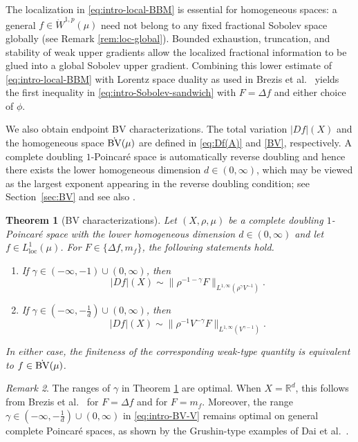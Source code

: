 \documentclass[11pt]{amsart}
\newtheorem{theorem}{Theorem}[section]
\theoremstyle{definition}
\theoremstyle{remark}
\newtheorem{remark}[theorem]{Remark}
\numberwithin{equation}{section}
\begin{document}
The localization in \eqref{eq:intro-local-BBM} is essential for homogeneous
spaces: a general $f\in\dot W^{1,p}(\mu)$ need not belong to any fixed
fractional Sobolev space globally (see Remark \ref{rem:loc-global}).  Bounded exhaustion,
truncation, and stability of
weak upper gradients allow the localized fractional information to be glued
into a global Sobolev upper gradient.  Combining this lower estimate of
\eqref{eq:intro-local-BBM}
with Lorentz space duality as used in Brezis et al.\ \cite{BSVY} yields the first
inequality in \eqref{eq:intro-Sobolev-sandwich} with $F=\Delta f$ and either
choice of $\phi$.

We also obtain endpoint BV characterizations.  The total variation
$|Df|(X)$ and the homogeneous space $\dot{\rm BV}(\mu)$ are defined in
\eqref{eq:Df(A)} and \eqref{BV}, respectively.  A complete doubling
$1$-Poincar\'e space is automatically reverse doubling and hence
there exists the lower homogeneous dimension
$d\in(0,\infty)$, which may be viewed as the largest exponent appearing in
the reverse doubling condition; see Section~\ref{sec:BV} and see also
\cite[(1.14)]{DLYYZ}.

\begin{theorem}[BV characterizations]\label{thm:intro-BV}
Let $(X,\rho,\mu)$ be a complete doubling $1$-Poincar\'e space
with the lower homogeneous dimension $d\in(0,\infty)$ and let
$f\in L^1_{\mathrm{loc}}(\mu)$.  For $F\in\{\Delta f,m_f\}$, the following statements hold.
\begin{enumerate}[\rm(i)]
\item If $\gamma\in(-\infty,-1)\cup(0,\infty)$, then
\begin{equation}
 |Df|(X)
 \sim \|\rho^{-1-\gamma}F\|_{L^{1,\infty}(\rho^\gamma V^{-1})}.
\end{equation}
\item If $\gamma\in(-\infty,-\frac1d)\cup(0,\infty)$, then
\begin{equation}\label{eq:intro-BV-V}
 |Df|(X)
 \sim \|\rho^{-1}V^{-\gamma}F\|_{L^{1,\infty}(V^{\gamma-1})}.
\end{equation}
\end{enumerate}
In either case, the finiteness of the corresponding weak-type quantity is
equivalent to $f\in\dot{\rm BV}(\mu)$.
\end{theorem}

\begin{remark}
The ranges of $\gamma$ in Theorem \ref{thm:intro-BV} are optimal. When
$X=\mathbb R^d$, this follows from Brezis et al.\
\cite[Theorem~1.4(i)]{BSVY} for $F=\Delta f$ and \cite[Remark 1.4(ii)]{ZLYYZ24}
for $F=m_f$. Moreover, the range
$\gamma\in(-\infty,-\frac1d)\cup(0,\infty)$ in
\eqref{eq:intro-BV-V} remains optimal on general complete Poincar\'e spaces,
as shown by the Grushin-type examples of Dai et al.\ \cite[Section~7]{DLYYZ}.
\end{remark}
\end{document}

